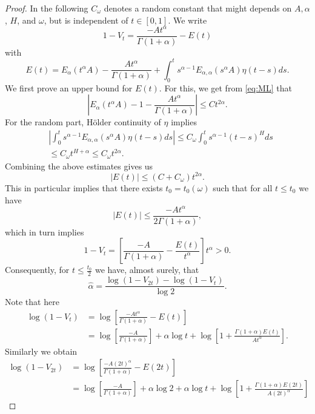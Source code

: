 \documentclass[11pt,reqno,oneside, a4paper]{amsart}
\numberwithin{equation}{section}
\theoremstyle{remark}
\begin{document}
\begin{proof}
In the following $C_\omega$ denotes a random constant that might depends on $A,\alpha$, $H$, and $\omega$, but is independent of $t \in [0,1]$. We write 
\begin{equation}
\label{eq:V-asymptotics}
1- V_t = \frac{-At^\alpha}{\Gamma(1+\alpha)} - E(t)
\end{equation}
with
$$
E(t) = E_\alpha(t^\alpha A) - \frac{At^\alpha}{\Gamma(1+\alpha)} + \int_0^t s^{\alpha-1}E_{\alpha,\alpha}(s^\alpha A)\eta(t-s)ds.
$$
We first prove an upper bound for $E(t)$. For this, we get from \eqref{eq:ML} that
\begin{equation}
\label{eq:deterministic-error}
\left|E_\alpha(t^\alpha A)-1 - \frac{At^\alpha}{\Gamma(1+\alpha)}\right| \leq Ct^{2\alpha}.
\end{equation}
For the random part, H\"older continuity of $\eta$ implies 
\begin{align*}
&\left\vert\int_0^t s^{\alpha-1}E_{\alpha,\alpha}(s^\alpha A)\eta(t-s)ds \right\vert \leq C_\omega \int_0^t s^{\alpha-1}(t-s)^Hds \\
& \leq C_\omega t^{H+\alpha} \leq C_\omega t^{2\alpha}.
\end{align*}
Combining the above estimates gives us 
\begin{equation}
\label{eq:E_bound}
|E(t)|\leq (C + C_\omega)t^{2\alpha}.
\end{equation}
This in particular implies that there exists $t_0=t_0(\omega)$ such that for all $t\leq t_0$ we have 
\begin{equation}
\label{eq:E_bound-chosen}
|E(t)| \leq \frac{-At^\alpha}{2\Gamma(1+\alpha)},
\end{equation}
which in turn implies 
$$
1-V_t = \left[\frac{-A}{\Gamma(1+\alpha)} - \frac{E(t)}{t^\alpha}\right]t^\alpha > 0.
$$
Consequently, for $t\leq \frac{t_0}{2}$ we have, almost surely, that 
$$
\hat\alpha = \frac{\log(1-V_{2t}) - \log(1-V_t)}{\log 2}.
$$
Note that here 
\begin{align*}
\log (1-V_t) &= \log\left[\frac{-At^\alpha}{\Gamma(1+\alpha)} - E(t)\right] \\
& = \log\left[\frac{-A}{\Gamma(1+\alpha)}\right] + \alpha \log t + \log\left[1+\frac{\Gamma(1+\alpha)E(t)}{At^\alpha}\right].
\end{align*}
Similarly we obtain 
\begin{align*}
\log (1-V_{2t}) &= \log\left[\frac{-A(2t)^\alpha}{\Gamma(1+\alpha)} - E(2t)\right] \\
& = \log\left[\frac{-A}{\Gamma(1+\alpha)}\right] + \alpha \log 2 + \alpha \log t + \log\left[1+\frac{\Gamma(1+\alpha)E(2t)}{A(2t)^\alpha}\right]

\end{align*}
\end{proof}
\end{document}
